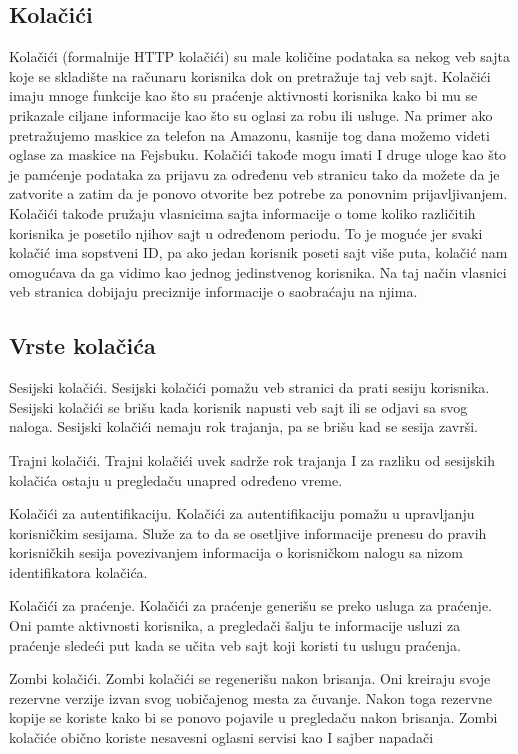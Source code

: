 \documentclass[a4paper]{article}
\begin{document}
	\subsection{Kolačići}
	
	 Kolačići (formalnije HTTP kolačići) su male količine podataka sa nekog veb sajta koje se skladište na računaru korisnika dok on pretražuje taj veb sajt. Kolačići imaju mnoge funkcije kao što su praćenje aktivnosti korisnika kako bi mu se prikazale ciljane informacije kao što su oglasi za robu ili usluge. Na primer ako pretražujemo maskice za telefon na Amazonu, kasnije tog dana možemo videti oglase za maskice na Fejsbuku. Kolačići takođe mogu imati I druge uloge kao što je pamćenje podataka za prijavu za određenu veb stranicu tako da možete da je zatvorite a zatim da je ponovo otvorite bez potrebe za ponovnim prijavljivanjem. Kolačići takođe pružaju vlasnicima sajta informacije o tome koliko različitih korisnika je posetilo njihov sajt u određenom periodu. To je moguće jer svaki kolačić ima sopstveni ID, pa ako jedan korisnik poseti sajt više puta, kolačić nam omogućava da ga vidimo kao jednog jedinstvenog korisnika. Na taj način vlasnici veb stranica dobijaju preciznije informacije o saobraćaju na njima.
	 
	 \subsection{Vrste kolačića}
	 
	 Sesijski kolačići. Sesijski kolačići pomažu veb stranici da prati sesiju korisnika. Sesijski kolačići se brišu kada korisnik napusti veb sajt ili se odjavi sa svog naloga. Sesijski kolačići nemaju rok trajanja, pa se brišu kad se sesija završi. 
	 
	 Trajni kolačići. Trajni kolačići uvek sadrže rok trajanja I za razliku od sesijskih kolačića ostaju u pregledaču unapred određeno vreme. 
	 
	 Kolačići za autentifikaciju. Kolačići za autentifikaciju pomažu u upravljanju korisničkim sesijama. Služe za to da se osetljive informacije prenesu do pravih korisničkih sesija povezivanjem informacija o korisničkom nalogu sa nizom identifikatora kolačića. 
	 
	 Kolačići za praćenje. Kolačići za praćenje generišu se preko usluga za praćenje. Oni pamte aktivnosti korisnika, a pregledači šalju te informacije usluzi za praćenje sledeći put kada se učita veb sajt koji koristi tu uslugu praćenja. 
	 
	 Zombi kolačići. Zombi kolačići se regenerišu nakon brisanja. Oni kreiraju svoje rezervne verzije izvan svog uobičajenog mesta za čuvanje. Nakon toga rezervne kopije se koriste kako bi se ponovo pojavile u pregledaču nakon brisanja. Zombi kolačiće obično koriste nesavesni oglasni servisi kao I sajber napadači 
	 
\end{document}
